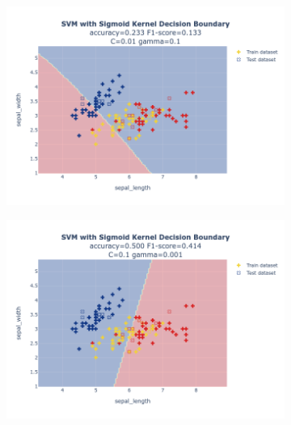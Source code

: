 \documentclass{article}
\begin{document}
\begin{figure}
\begin{subfigure}{0.3\textwidth}
        \includegraphics[scale=.13]{images/implementation/q1/sigmoid_kernel/sepal_length_sepal_width_0.01_0.1.png}
    \end{subfigure}
    \newline
    \begin{subfigure}{0.3\textwidth}
        \centering
        \includegraphics[scale=.13]{images/implementation/q1/sigmoid_kernel/sepal_length_sepal_width_0.1_0.001.png}
    \end{subfigure}
    \hfill
    \begin{subfigure}{0.3\textwidth}
        \centering

\end{subfigure}
\end{figure}
\end{document}
